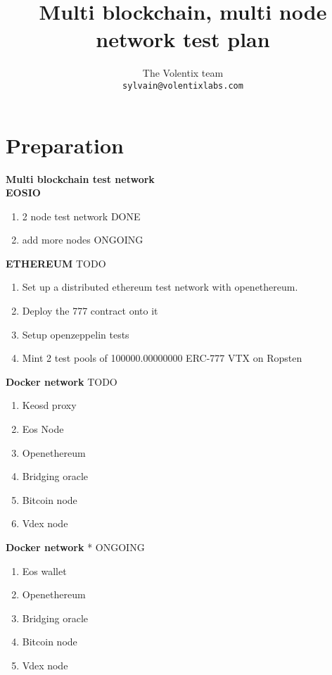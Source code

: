 \documentclass[]{article}
\title{Multi blockchain, multi node network test plan}
\author{
		The Volentix team\\
	\texttt{sylvain@volentixlabs.com}
}
\begin{document}
\maketitle


\section{Preparation}

\textbf{Multi blockchain test network}  \\		   
   \textbf{EOSIO}  
   \begin{enumerate}
		\item 2 node test network {\color{green} DONE} 
			\item add more nodes {\color{yellow} ONGOING} 
   	  \end{enumerate}   
	 \textbf{ETHEREUM} {\color{red} TODO} 
	   \begin{enumerate}
	   	\item Set up a distributed ethereum test network with openethereum. \item Deploy the 777 contract onto it
	   	\item Setup openzeppelin tests
	   	\item Mint 2 test pools of 100000.00000000 ERC-777 VTX on Ropsten
	   	\end{enumerate}       
   \textbf{Docker network}	  {\color{red} TODO} 
\begin{enumerate}
	\item Keosd proxy
		\item Eos Node
	\item Openethereum
	\item Bridging oracle
	\item Bitcoin node
	\item Vdex node
\end{enumerate}   
			 
   \textbf{Docker network}	  * {\color{yellow} ONGOING}
  \begin{enumerate}
  	\item Eos wallet
  	\item Openethereum
  	\item Bridging oracle
  	\item Bitcoin node
  	\item Vdex node
  \end{enumerate}
   \
 
\end{document}
